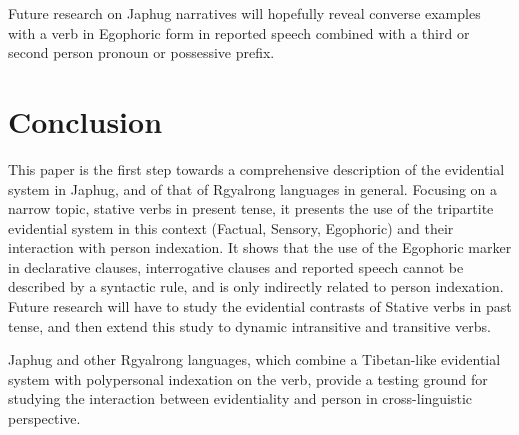 \documentclass[11pt]{article}
\begin{document}
Future research on Japhug narratives will hopefully reveal converse examples with a verb in Egophoric form in reported speech combined with a third or second person pronoun or possessive prefix.

\section*{Conclusion}
This paper is the first step towards a comprehensive description of the evidential system in Japhug, and of that of Rgyalrong languages in general. Focusing on a narrow topic, stative verbs in present tense, it presents the use of the tripartite evidential system in this context (Factual, Sensory, Egophoric) and their interaction with person indexation. It shows that the use of the Egophoric marker in declarative clauses, interrogative clauses and reported speech cannot be described by a syntactic rule, and is only indirectly related to person indexation. Future research will have to study the evidential contrasts of Stative verbs in past tense, and then extend this study to dynamic intransitive and transitive verbs.

Japhug and other Rgyalrong languages, which combine a Tibetan-like evidential system with polypersonal indexation on the verb, provide a testing ground for studying the interaction between evidentiality and person in cross-linguistic perspective.



\end{document}
